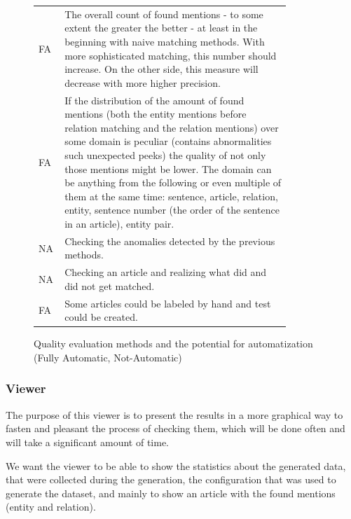 \begin{figure}

\begin{tabular}{p{0.05\linewidth}p{0.8\linewidth}}

FA & The overall count of found mentions - to some extent the greater the better - at least in the beginning with naive matching methods. With more sophisticated matching, this number should increase. On the other side, this measure will decrease with more higher precision. \\ 
FA & If the distribution of the amount of found mentions (both the entity mentions before relation matching and the relation mentions) over some domain is peculiar (contains abnormalities such unexpected peeks) the quality of not only those mentions might be lower. The domain can be anything from the following or even multiple of them at the same time:
sentence, article, relation, entity, sentence number (the order of the sentence in an article), entity pair. \\ 
NA & Checking the anomalies detected by the previous methods.  \\ 
NA & Checking an article and realizing what did and did not get matched. \\ 
FA & Some articles could be labeled by hand and test could be created.\\

\end{tabular} 

\caption{Quality evaluation methods and the potential for automatization (Fully Automatic, Not-Automatic)}
\label{tab:qualityEval}
\end{figure}


\subsubsection{Viewer}
The purpose of this viewer is to present the results in a more graphical way to fasten and pleasant the process of checking them, which will be done often and will take a significant amount of time.

We want the viewer to be able to show the statistics about the generated data, that were collected during the generation, the configuration that was used to generate the dataset, and mainly to show an article with the found mentions (entity and relation). 

